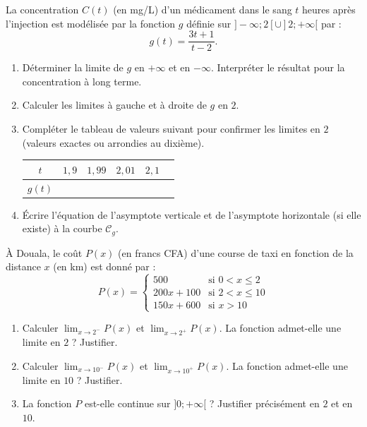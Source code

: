 \documentclass[11pt]{article}
\begin{document}
\begin{exercice}
La concentration $C(t)$ (en mg/L) d'un médicament dans le sang $t$ heures après l'injection est modélisée par la fonction $g$ définie sur $]-\infty ; 2[ \cup ]2 ; +\infty[$ par :
\[ g(t) = \frac{3t + 1}{t - 2}. \]
\begin{enumerate}
    \item Déterminer la limite de $g$ en $+\infty$ et en $-\infty$. Interpréter le résultat pour la concentration à long terme.
    \item Calculer les limites à gauche et à droite de $g$ en $2$.
    \item Compléter le tableau de valeurs suivant pour confirmer les limites en $2$ (valeurs exactes ou arrondies au dixième).
    \begin{center}
    \begin{tabular}{|c|c|c|c|c|c|}
    \hline
    $t$ & $1,9$ & $1,99$ & $2,01$ & $2,1$ \\
    \hline
    $g(t)$ &  &  &  & \\
    \hline
    \end{tabular}
    \end{center}
    \item Écrire l'équation de l'asymptote verticale et de l'asymptote horizontale (si elle existe) à la courbe $\mathcal{C}_g$.
\end{enumerate}
\end{exercice}

\begin{exercice}
À Douala, le coût $P(x)$ (en francs CFA) d'une course de taxi en fonction de la distance $x$ (en km) est donné par :
\[ P(x) = \begin{cases}
500 & \text{si } 0 < x \leq 2 \\
200x + 100 & \text{si } 2 < x \leq 10 \\
150x + 600 & \text{si } x > 10
\end{cases} \]
\begin{enumerate}
    \item Calculer $\lim_{x \to 2^-} P(x)$ et $\lim_{x \to 2^+} P(x)$. La fonction admet-elle une limite en $2$ ? Justifier.
    \item Calculer $\lim_{x \to 10^-} P(x)$ et $\lim_{x \to 10^+} P(x)$. La fonction admet-elle une limite en $10$ ? Justifier.
    \item La fonction $P$ est-elle continue sur $]0 ; +\infty[$ ? Justifier précisément en $2$ et en $10$.
\end{enumerate}
\end{exercice}
\end{document}

